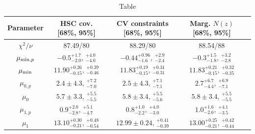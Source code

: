 \documentclass[a4paper,11pt]{article}
\begin{document}
\begin{table}
\begin{center}
\begin{tabular}{c | c c c c} 
 \hline\hline
 Parameter & HSC cov. [68\%, 95\%] & CV constraints [68\%, 95\%] & Marg. $N(z)$ [68\%, 95\%] \\ [0.5ex] 
 \hline
 $\chi^2/\nu$ & 87.49/80 & 88.29/80 & 88.54/88 \\ 
$\mu_{{\rm min},p}$ & $-0.5^{+1.7}_{-2.0}$, $^{+4.0}_{-4.0}$ & $-0.44^{+0.96}_{-1.6}$, $^{+2.9}_{-2.4}$ & $-0.3^{+1.5}_{-1.8}$, $^{+3.2}_{-2.8}$ \\ [1ex]
$\mu_{\rm min}$ & $11.90^{+0.26}_{-0.15}$, $^{+0.39}_{-0.46}$ & $11.83^{+0.19}_{-0.15}$, $^{+0.31}_{-0.31}$ & $11.83^{+0.21}_{-0.15}$, $^{+0.32}_{-0.35}$ \\ [1ex]
$\mu_{0,p}$ & $2.4\pm 4.3$, $^{+7.2}_{-7.0}$ & $2.5\pm 4.3$, $^{+7.1}_{-7.1}$ & $2.7^{+6.7}_{-4.4}$, $^{+6.9}_{-7.1}$ \\ [1ex]
$\mu_{0}$ & $5.7\pm 3.3$, $^{+5.5}_{-5.5}$ & $5.8\pm 3.4$, $^{+5.5}_{-5.6}$ & $5.8\pm 3.4$, $^{+5.5}_{-5.5}$ \\ [1ex]
$\mu_{1,p}$ & $0.9^{+2.0}_{-2.8}$, $^{+5.1}_{-4.7}$ & $0.8^{+1.0}_{-2.2}$, $^{+4.0}_{-3.0}$ & $1.0^{+1.6}_{-2.6}$, $^{+4.1}_{-3.5}$ \\ [1ex]
$\mu_{1}$ & $13.10^{+0.30}_{-0.21}$, $^{+0.48}_{-0.54}$ & $12.99\pm 0.24$, $^{+0.41}_{-0.39}$ & $13.00^{+0.25}_{-0.21}$, $^{+0.42}_{-0.44}$ \\ [1ex]
 \hline
 \hline
\end{tabular}
\end{center}
\label{tab:chi2_tests}
\caption{Table}
\end{table}
\end{document}

